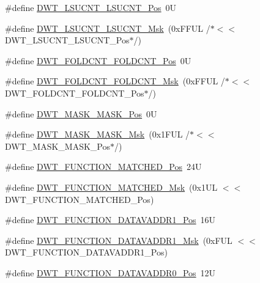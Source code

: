 \begin{DoxyCompactItemize}
\item 
\#define \hyperlink{group___c_m_s_i_s___d_w_t_gab9394c7911b0b4312a096dad91d53a3d}{D\+W\+T\+\_\+\+L\+S\+U\+C\+N\+T\+\_\+\+L\+S\+U\+C\+N\+T\+\_\+\+Pos}~0U
\item 
\#define \hyperlink{group___c_m_s_i_s___d_w_t_ga2186d7fc9317e20bad61336ee2925615}{D\+W\+T\+\_\+\+L\+S\+U\+C\+N\+T\+\_\+\+L\+S\+U\+C\+N\+T\+\_\+\+Msk}~(0x\+F\+F\+U\+L /$\ast$$<$$<$ D\+W\+T\+\_\+\+L\+S\+U\+C\+N\+T\+\_\+\+L\+S\+U\+C\+N\+T\+\_\+\+Pos$\ast$/)
\item 
\#define \hyperlink{group___c_m_s_i_s___d_w_t_ga7f8af5ac12d178ba31a516f6ed141455}{D\+W\+T\+\_\+\+F\+O\+L\+D\+C\+N\+T\+\_\+\+F\+O\+L\+D\+C\+N\+T\+\_\+\+Pos}~0U
\item 
\#define \hyperlink{group___c_m_s_i_s___d_w_t_ga9cb73d0342d38b14e41027d3c5c02647}{D\+W\+T\+\_\+\+F\+O\+L\+D\+C\+N\+T\+\_\+\+F\+O\+L\+D\+C\+N\+T\+\_\+\+Msk}~(0x\+F\+F\+U\+L /$\ast$$<$$<$ D\+W\+T\+\_\+\+F\+O\+L\+D\+C\+N\+T\+\_\+\+F\+O\+L\+D\+C\+N\+T\+\_\+\+Pos$\ast$/)
\item 
\#define \hyperlink{group___c_m_s_i_s___d_w_t_gaf798ae34e2b9280ea64f4d9920cd2e7d}{D\+W\+T\+\_\+\+M\+A\+S\+K\+\_\+\+M\+A\+S\+K\+\_\+\+Pos}~0U
\item 
\#define \hyperlink{group___c_m_s_i_s___d_w_t_gadd798deb0f1312feab4fb05dcddc229b}{D\+W\+T\+\_\+\+M\+A\+S\+K\+\_\+\+M\+A\+S\+K\+\_\+\+Msk}~(0x1\+F\+U\+L /$\ast$$<$$<$ D\+W\+T\+\_\+\+M\+A\+S\+K\+\_\+\+M\+A\+S\+K\+\_\+\+Pos$\ast$/)
\item 
\#define \hyperlink{group___c_m_s_i_s___d_w_t_ga22c5787493f74a6bacf6ffb103a190ba}{D\+W\+T\+\_\+\+F\+U\+N\+C\+T\+I\+O\+N\+\_\+\+M\+A\+T\+C\+H\+E\+D\+\_\+\+Pos}~24U
\item 
\#define \hyperlink{group___c_m_s_i_s___d_w_t_gac8b1a655947490280709037808eec8ac}{D\+W\+T\+\_\+\+F\+U\+N\+C\+T\+I\+O\+N\+\_\+\+M\+A\+T\+C\+H\+E\+D\+\_\+\+Msk}~(0x1\+U\+L $<$$<$ D\+W\+T\+\_\+\+F\+U\+N\+C\+T\+I\+O\+N\+\_\+\+M\+A\+T\+C\+H\+E\+D\+\_\+\+Pos)
\item 
\#define \hyperlink{group___c_m_s_i_s___d_w_t_ga8b75e8ab3ffd5ea2fa762d028dc30e8c}{D\+W\+T\+\_\+\+F\+U\+N\+C\+T\+I\+O\+N\+\_\+\+D\+A\+T\+A\+V\+A\+D\+D\+R1\+\_\+\+Pos}~16U
\item 
\#define \hyperlink{group___c_m_s_i_s___d_w_t_gafdbf5a8c367befe8661a4f6945c83445}{D\+W\+T\+\_\+\+F\+U\+N\+C\+T\+I\+O\+N\+\_\+\+D\+A\+T\+A\+V\+A\+D\+D\+R1\+\_\+\+Msk}~(0x\+F\+U\+L $<$$<$ D\+W\+T\+\_\+\+F\+U\+N\+C\+T\+I\+O\+N\+\_\+\+D\+A\+T\+A\+V\+A\+D\+D\+R1\+\_\+\+Pos)
\item 
\#define \hyperlink{group___c_m_s_i_s___d_w_t_ga9854cd8bf16f7dce0fb196a8029b018e}{D\+W\+T\+\_\+\+F\+U\+N\+C\+T\+I\+O\+N\+\_\+\+D\+A\+T\+A\+V\+A\+D\+D\+R0\+\_\+\+Pos}~12U

\end{DoxyCompactItemize}
